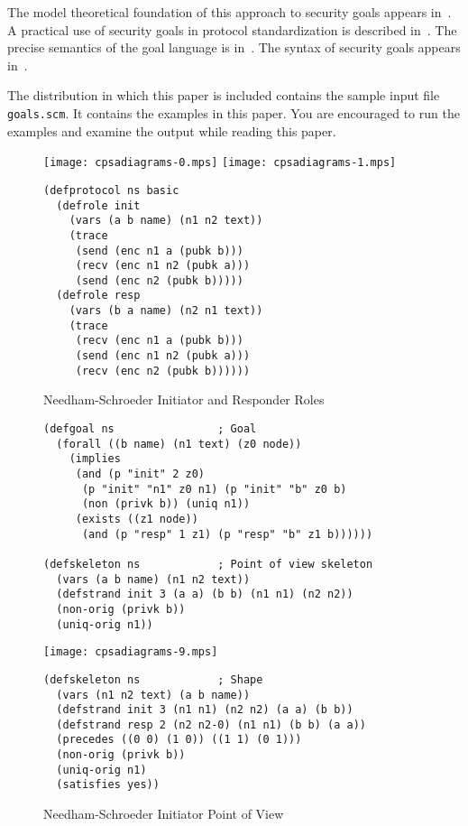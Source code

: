 \documentclass[12pt]{article}
\begin{document}
The model theoretical foundation of this approach to security goals
appears in~\cite{Guttman14}.  A practical use of security goals in
protocol standardization is described in~\cite{GuttmanLiskovRowe14}.
The precise semantics of the goal language is
in~\cite[Appendix~C]{cpsaspec09}.  The syntax of security goals
appears in~\cite[Table~2]{cpsaprimer09}.

The distribution in which this paper is included contains the sample
input {\cpsa} file \texttt{goals.scm}.  It contains the examples in
this paper.  You are encouraged to run the examples and examine the
output while reading this paper.


\begin{figure}
\begin{center}
\texttt{[image: cpsadiagrams-0.mps]}\hfil
\texttt{[image: cpsadiagrams-1.mps]}\\
\end{center}
\begin{center}
\begin{minipage}{3in}
\begin{verbatim}
(defprotocol ns basic
  (defrole init
    (vars (a b name) (n1 n2 text))
    (trace
     (send (enc n1 a (pubk b)))
     (recv (enc n1 n2 (pubk a)))
     (send (enc n2 (pubk b)))))
  (defrole resp
    (vars (b a name) (n2 n1 text))
    (trace
     (recv (enc n1 a (pubk b)))
     (send (enc n1 n2 (pubk a)))
     (recv (enc n2 (pubk b))))))
\end{verbatim}
\end{minipage}
\end{center}
\caption{Needham-Schroeder Initiator and Responder Roles}
\label{fig:ns roles}
\end{figure}

\begin{figure}
\begin{verbatim}
(defgoal ns                ; Goal
  (forall ((b name) (n1 text) (z0 node))
    (implies
     (and (p "init" 2 z0)
      (p "init" "n1" z0 n1) (p "init" "b" z0 b)
      (non (privk b)) (uniq n1))
     (exists ((z1 node))
      (and (p "resp" 1 z1) (p "resp" "b" z1 b))))))

(defskeleton ns            ; Point of view skeleton
  (vars (a b name) (n1 n2 text))
  (defstrand init 3 (a a) (b b) (n1 n1) (n2 n2))
  (non-orig (privk b))
  (uniq-orig n1))
\end{verbatim}
\begin{center}
\texttt{[image: cpsadiagrams-9.mps]}
\end{center}
\begin{verbatim}
(defskeleton ns            ; Shape
  (vars (n1 n2 text) (a b name))
  (defstrand init 3 (n1 n1) (n2 n2) (a a) (b b))
  (defstrand resp 2 (n2 n2-0) (n1 n1) (b b) (a a))
  (precedes ((0 0) (1 0)) ((1 1) (0 1)))
  (non-orig (privk b))
  (uniq-orig n1)
  (satisfies yes))
\end{verbatim}
\caption{Needham-Schroeder Initiator Point of View}
\label{fig:ns init}
\end{figure}
\end{document}
